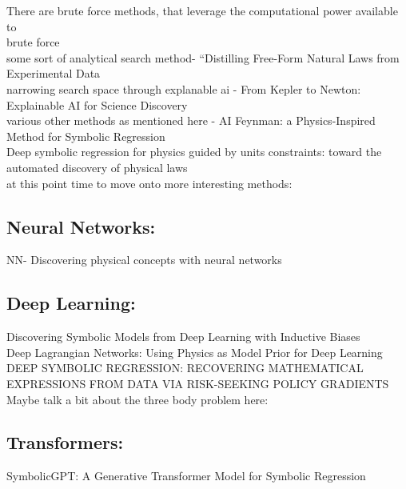 \documentclass{article}
\begin{document}
There are brute force methods, that leverage the computational power available to \\
brute force\\
some sort of analytical search method- “Distilling Free-Form Natural Laws from Experimental Data\\
narrowing search space through explanable ai - From Kepler to Newton: Explainable AI for Science Discovery\\
various other methods as mentioned here - AI Feynman: a Physics-Inspired Method for Symbolic Regression\\ 
Deep symbolic regression for physics guided by units constraints:
toward the automated discovery of physical laws\\ 


at this point time to move onto more interesting methods: \\

\subsection{Neural Networks: }

NN- Discovering physical concepts with neural networks\\ 

\subsection{ Deep Learning: }
Discovering Symbolic Models from Deep Learning
with Inductive Biases\\ 

Deep Lagrangian Networks:
Using Physics as Model Prior for Deep Learning\\ 

DEEP SYMBOLIC REGRESSION:
RECOVERING MATHEMATICAL EXPRESSIONS FROM
DATA VIA RISK-SEEKING POLICY GRADIENTS\\ 

Maybe talk a bit about the three body problem here: \\ 
\subsection{Transformers: }

SymbolicGPT: A Generative Transformer Model for
Symbolic Regression\\ 

\end{document}
